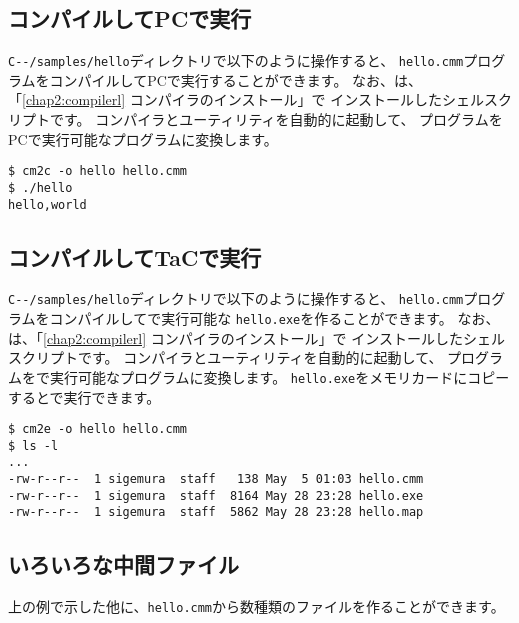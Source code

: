 \subsection{コンパイルしてPCで実行}

\verb;C--/samples/hello;ディレクトリで以下のように操作すると、
{\tt hello.cmm}プログラムをコンパイルしてPCで実行することができます。
なお、{\cmc}は、「\ref{chap2:compilerl} コンパイラのインストール」で
インストールしたシェルスクリプトです。
コンパイラとユーティリティを自動的に起動して、
{\cmml}プログラムをPCで実行可能なプログラムに変換します。

\begin{mylist}
\begin{verbatim}
$ cm2c -o hello hello.cmm 
$ ./hello
hello,world
\end{verbatim}
\end{mylist}

\subsection{コンパイルしてTaCで実行}

\verb;C--/samples/hello;ディレクトリで以下のように操作すると、
{\tt hello.cmm}プログラムをコンパイルして{\tac}で実行可能な
{\tt hello.exe}を作ることができます。
なお、{\cme}は、「\ref{chap2:compilerl} コンパイラのインストール」で
インストールしたシェルスクリプトです。
コンパイラとユーティリティを自動的に起動して、
{\cmml}プログラムを{\tac}で実行可能なプログラムに変換します。
{\tt hello.exe}をメモリカードにコピーすると{\tac}で実行できます。

\begin{mylist}
\begin{verbatim}
$ cm2e -o hello hello.cmm 
$ ls -l
...
-rw-r--r--  1 sigemura  staff   138 May  5 01:03 hello.cmm
-rw-r--r--  1 sigemura  staff  8164 May 28 23:28 hello.exe
-rw-r--r--  1 sigemura  staff  5862 May 28 23:28 hello.map
\end{verbatim}
\end{mylist}

\subsection{いろいろな中間ファイル}

上の例で示した他に、{\tt hello.cmm}から数種類のファイルを作ることができます。

